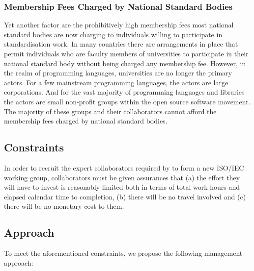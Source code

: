 \documentclass[10pt,a4paper,leqno,fleqn]{article}
\begin{document}
\subsubsection{Membership Fees Charged by National Standard Bodies}
Yet another factor are the prohibitively high membership fees most national
standard bodies are now charging to individuals willing to participate in
standardisation work. In many countries there are arrangements in place that
permit individuals who are faculty members of universities to participate in their
national standard body without being charged any membership fee. However,
in the realm of programming languages, universities are no longer the primary
actors. For a few mainstream programming languages, the actors are large
corporations. And for the vast majority of programming languages and libraries
the actors are small non-profit groups within the open source software movement.
The majority of these groups and their collaborators cannot afford the membership
fees charged by national standard bodies.

\subsection{Constraints}
In order to recruit the expert collaborators required by \cite{II2020} to form a new
ISO/IEC working group, collaborators must be given assurances that (a) the effort
they will have to invest is reasonably limited both in terms of total work hours and
elapsed calendar time to completion, (b) there will be no travel involved and
(c) there will be no monetary cost to them.

\subsection{Approach}
To meet the aforementioned constraints, we propose the following management
approach:
\end{document}
